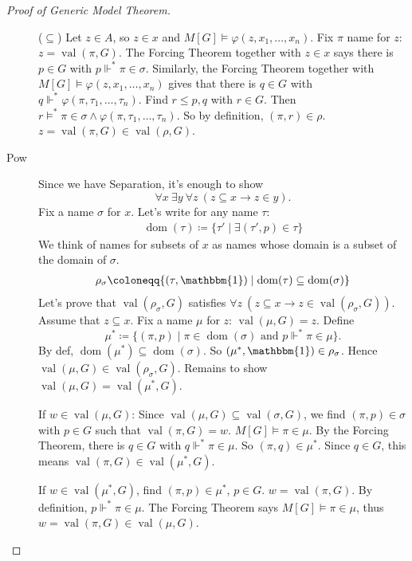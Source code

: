 \documentclass{article}
\newcommand{\1}{\mathbbm{1}}
\DeclareMathOperator{\dom}{dom}
\DeclareMathOperator{\val}{val}
\let\models\vDash
\let\forces\Vdash
\begin{document}
\begin{proof}[Proof of Generic Model Theorem]
\begin{description}
      ($\subseteq$) Let $z \in A$, so $z \in x$ and $M[G] \models \varphi(z, x_1, \dotsc, x_n)$. Fix $\pi$ name for $z$: $z=\val(\pi,G)$.
      The Forcing Theorem together with $z \in x$ says there is $p \in G$  with $p \forces^* \pi \in \sigma$.
      Similarly, the Forcing Theorem together with $M[G] \models \varphi(z, x_1, \dotsc, x_n)$ gives that there is $q \in G$ with $q \forces^* \varphi(\pi, \tau_1, \dotsc, \tau_n)$.
      Find $r \leq p,q$ with $r \in G$.
      Then $r \models^* \pi \in \sigma \land \varphi(\pi, \tau_1, \dotsc, \tau_n)$. So by definition, $(\pi,r) \in \rho$.
      $z = \val(\pi,G) \in \val(\rho,G)$.
    \item[\textsf{Pow}] Since we have Separation, it's enough to show
      \begin{equation*}
        \forall x\ \exists y\ \forall z\ (z \subseteq x \rightarrow z \in y).
      \end{equation*}
      Fix a name $\sigma$ for $x$. Let's write for any name $\tau$:
      \begin{align*}
        \dom(\tau) \coloneqq \{\tau' \mid \exists (\tau',p) \in \tau\}
      \end{align*}
      We think of names for subsets of $x$ as names whose domain is a subset of the domain of $\sigma$.
      \begin{align*}
        \rho_\sigma \coloneqq \{(\tau,\1) \mid \dom(\tau) \subseteq \dom(\sigma)\}
      \end{align*}
      Let's prove that $\val(\rho_\sigma,G)$ satisfies $\forall z \ (z \subseteq x \rightarrow z \in \val(\rho_\sigma,G))$.
      Assume that $z \subseteq x$. Fix a name $\mu$ for $z$: $\val(\mu,G) = z$.
      Define
      \begin{equation*}
        \mu^* \coloneqq \{(\pi,p) \mid \pi \in \dom(\sigma) \text{ and } p \forces^* \pi \in \mu\}.
      \end{equation*}
      By def, $\dom(\mu^*) \subseteq \dom(\sigma)$. So $(\mu^*,\1) \in \rho_\sigma$. Hence $\val(\mu,G) \in \val(\rho_\sigma,G)$.
      Remains to show $\val(\mu,G) = \val(\mu^*,G)$.

      If $w \in \val(\mu,G)$: Since $\val(\mu,G) \subseteq \val(\sigma,G)$, we find $(\pi,p) \in \sigma$ with $p \in G$ such that $\val(\pi,G) = w$.
      $M[G] \models \pi \in \mu$. By the Forcing Theorem, there is $q \in G$ with $q \forces^* \pi \in \mu$.
      So $(\pi,q) \in \mu^*$. Since $q \in G$, this means $\val(\pi,G) \in \val(\mu^*,G)$.

      If $w \in \val(\mu^*,G)$, find $(\pi,p) \in \mu^*$, $p \in G$. $w = \val(\pi,G)$. By definition, $p \forces^* \pi \in \mu$.
      The Forcing Theorem says $M[G] \models \pi \in \mu$, thus $w = \val(\pi,G) \in \val(\mu,G)$.
  \end{description}
\end{proof}
\end{document}
